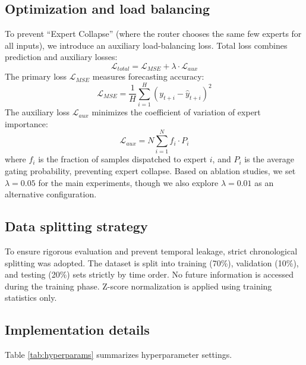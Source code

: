 \documentclass[review,3p,times,draft]{elsarticle}
\begin{document}
\subsection{Optimization and load balancing}
To prevent ``Expert Collapse'' (where the router chooses the same few experts for all inputs), we introduce an auxiliary load-balancing loss. Total loss combines prediction and auxiliary losses:
\begin{equation}
    \mathcal{L}_{total} = \mathcal{L}_{MSE} + \lambda \cdot \mathcal{L}_{aux}
\end{equation}
The primary loss $\mathcal{L}_{MSE}$ measures forecasting accuracy:
\begin{equation}
    \mathcal{L}_{MSE} = \frac{1}{H} \sum_{i=1}^{H} (y_{t+i} - \hat{y}_{t+i})^2
\end{equation}
The auxiliary loss $\mathcal{L}_{aux}$ minimizes the coefficient of variation of expert importance:
\begin{equation}
    \mathcal{L}_{aux} = N \sum_{i=1}^{N} f_i \cdot P_i
\end{equation}
where $f_i$ is the fraction of samples dispatched to expert $i$, and $P_i$ is the average gating probability, preventing expert collapse. Based on ablation studies, we set $\lambda = 0.05$ for the main experiments, though we also explore $\lambda = 0.01$ as an alternative configuration.

\subsection{Data splitting strategy}
To ensure rigorous evaluation and prevent temporal leakage, strict chronological splitting was adopted. The dataset is split into training (70\%), validation (10\%), and testing (20\%) sets strictly by time order. No future information is accessed during the training phase. Z-score normalization is applied using training statistics only.

\subsection{Implementation details}
Table \ref{tab:hyperparams} summarizes hyperparameter settings.
\end{document}
